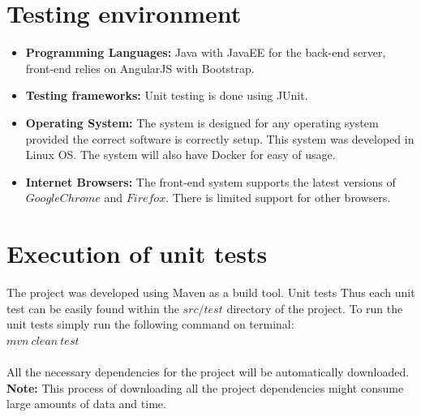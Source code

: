 \documentclass[11pt,a4paper]{article}
\begin{document}
\section{Testing environment}
\begin{itemize}
	\item \textbf{Programming Languages:} Java with JavaEE for the back-end server, front-end relies on AngularJS with Bootstrap.
	\item \textbf{Testing frameworks: } Unit testing is done using JUnit.
	\item \textbf{Operating System: } The system is designed for any operating system provided the correct software is correctly setup. This system was developed in Linux OS. The system will also have Docker for easy of usage.
	\item \textbf{Internet Browsers: } The front-end system supports the latest versions of 
	$Google Chrome$ and $Firefox$. There is limited support for other browsers.
\end{itemize}

\section{Execution of unit tests}	
The project was developed using Maven as a build tool. Unit tests Thus each unit test can be easily found within the $src/test$ directory of the project. To run the unit tests simply run the following command on terminal: \\

$mvn\ clean\ test$ \\\\
All the necessary dependencies for the project will be automatically downloaded. \textbf{Note:} This process of downloading all the project dependencies might consume large amounts of data and time.
\end{document}
